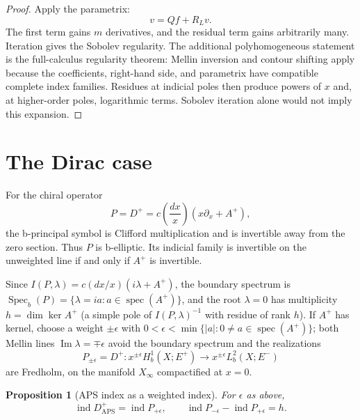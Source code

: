 \documentclass[12pt,oneside,reqno]{article}
\theoremstyle{plain}
\newtheorem{proposition}[theorem]{Proposition}
\theoremstyle{definition}
\theoremstyle{remark}
\begin{document}
\begin{proof}
Apply the parametrix:
\[
 v=Qf+R_Lv.
\]
The first term gains \(m\) derivatives, and the residual term gains
arbitrarily many. Iteration gives the Sobolev regularity. The additional
polyhomogeneous statement is the full-calculus regularity theorem: Mellin
inversion and contour shifting apply because the coefficients,
right-hand side, and parametrix have compatible complete index families.
Residues at indicial poles then produce powers of \(x\) and, at
higher-order poles, logarithmic terms. Sobolev iteration alone would not
imply this expansion.
\end{proof}

\section{The Dirac case}

For the chiral operator
\[
 P=D^+=c\!\left(\frac{dx}{x}\right)(x\partial_x+A^+),
\]
the b-principal symbol is Clifford multiplication and is invertible away
from the zero section. Thus \(P\) is b-elliptic. Its indicial family is
invertible on the unweighted line if and only if
\(A^+\) is invertible.

Since \(I(P,\lambda)=c(dx/x)(i\lambda+A^+)\), the boundary spectrum is
\(\operatorname{Spec}_b(P)=\{\lambda=ia:a\in\operatorname{spec}(A^+)\}\),
and the root \(\lambda=0\) has multiplicity \(h=\dim\ker A^+\) (a simple
pole of \(I(P,\lambda)^{-1}\) with residue of rank \(h\)). If \(A^+\) has
kernel, choose a weight \(\pm\epsilon\) with
\(0<\epsilon<\min\{|a|:0\neq a\in\operatorname{spec}(A^+)\}\); both Mellin
lines \(\operatorname{Im}\lambda=\mp\epsilon\) avoid the boundary spectrum
and the realizations
\[
 P_{\pm\epsilon}=D^+:x^{\pm\epsilon}H_b^1(X;E^+)\longrightarrow
 x^{\pm\epsilon}L_b^2(X;E^-)
\]
are Fredholm, on the manifold \(X_\infty\) compactified at
\(x=0\).

\begin{proposition}[APS index as a weighted index]\label{prop:weighted-APS}
For \(\epsilon\) as above,
\[
 \operatorname{ind}D^+_{\mathrm{APS}}=\operatorname{ind}P_{+\epsilon},
 \qquad
 \operatorname{ind}P_{-\epsilon}-\operatorname{ind}P_{+\epsilon}=h .
\]
\end{proposition}
\end{document}
